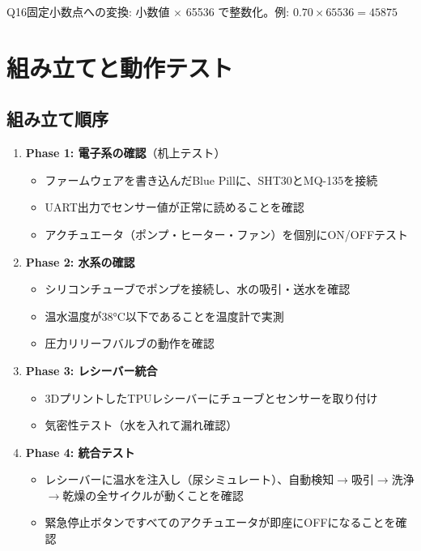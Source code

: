 \documentclass[a4paper,11pt]{article}
\begin{document}
\begin{tipbox}
Q16固定小数点への変換: 小数値 $\times$ 65536 で整数化。例: $0.70 \times 65536 = 45875$
\end{tipbox}

\newpage
\section{組み立てと動作テスト}

\subsection{組み立て順序}

\begin{enumerate}[leftmargin=2em]
  \item \textbf{Phase 1: 電子系の確認}（机上テスト）
    \begin{itemize}
      \item ファームウェアを書き込んだBlue Pillに、SHT30とMQ-135を接続
      \item UART出力でセンサー値が正常に読めることを確認
      \item アクチュエータ（ポンプ・ヒーター・ファン）を個別にON/OFFテスト
    \end{itemize}
  \item \textbf{Phase 2: 水系の確認}
    \begin{itemize}
      \item シリコンチューブでポンプを接続し、水の吸引・送水を確認
      \item 温水温度が38°C以下であることを温度計で実測
      \item 圧力リリーフバルブの動作を確認
    \end{itemize}
  \item \textbf{Phase 3: レシーバー統合}
    \begin{itemize}
      \item 3DプリントしたTPUレシーバーにチューブとセンサーを取り付け
      \item 気密性テスト（水を入れて漏れ確認）
    \end{itemize}
  \item \textbf{Phase 4: 統合テスト}
    \begin{itemize}
      \item レシーバーに温水を注入し（尿シミュレート）、自動検知$\to$吸引$\to$洗浄$\to$乾燥の全サイクルが動くことを確認
      \item 緊急停止ボタンですべてのアクチュエータが即座にOFFになることを確認
    \end{itemize}
\end{enumerate}
\end{document}
